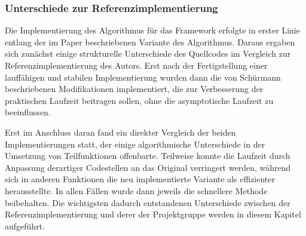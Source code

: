 \subsubsection{Unterschiede zur Referenzimplementierung}
\label{bpr:effizienz:modifikationen}

Die Implementierung des \bpr Algorithmus für das \sacabench Framework erfolgte in erster Linie entlang der im Paper \cite{schuermann2005} beschriebenen Variante des Algorithmus. Daraus ergaben sich zunächst einige strukturelle Unterschiede des Quellcodes im Vergleich zur Referenzimplementierung des Autors. Erst nach der Fertigstellung einer lauffähigen und stabilen Implementierung wurden dann die von Schürmann beschriebenen Modifikationen \cite[Kapitel 3]{schuermann2005} implementiert, die zur Verbesserung der praktischen Laufzeit beitragen sollen, ohne die asymptotische Laufzeit zu beeinflussen.\par
Erst im Anschluss daran fand ein direkter Vergleich der beiden Implementierungen statt, der einige algorithmische Unterschiede in der Umsetzung von Teilfunktionen offenbarte. Teilweise konnte die Laufzeit durch Anpassung derartiger Codestellen an das Original verringert werden, während sich in anderen Funktionen die neu implementierte Variante als effizienter herausstellte. In allen Fällen wurde dann jeweils die schnellere Methode beibehalten. Die wichtigsten dadurch entstandenen Unterschiede zwischen der Referenzimplementierung und derer der Projektgruppe werden in diesem Kapitel aufgeführt.

